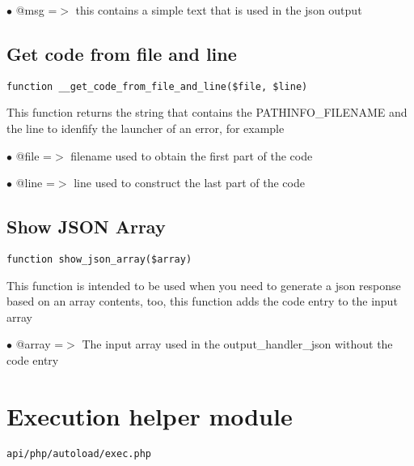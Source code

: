 \documentclass[a4paper]{book}
\begin{document}
\begin{compactitem}
\item[\color{myblue}$\bullet$] @msg =$>$ this contains a simple text that is used in the json output
\end{compactitem}

\hypertarget{toc112}{}
\subsection{Get code from file and line}

\begin{lstlisting}
function __get_code_from_file_and_line($file, $line)
\end{lstlisting}

This function returns the string that contains the PATHINFO\_FILENAME and the line to idenfify
the launcher of an error, for example

\begin{compactitem}
\item[\color{myblue}$\bullet$] @file =$>$ filename used to obtain the first part of the code
\item[\color{myblue}$\bullet$] @line =$>$ line used to construct the last part of the code
\end{compactitem}

\hypertarget{toc113}{}
\subsection{Show JSON Array}

\begin{lstlisting}
function show_json_array($array)
\end{lstlisting}

This function is intended to be used when you need to generate a json response based on
an array contents, too, this function adds the code entry to the input array

\begin{compactitem}
\item[\color{myblue}$\bullet$] @array =$>$ The input array used in the output\_handler\_json without the code entry
\end{compactitem}

\hypertarget{toc114}{}
\section{Execution helper module}

\begin{lstlisting}
api/php/autoload/exec.php
\end{lstlisting}
\end{document}
